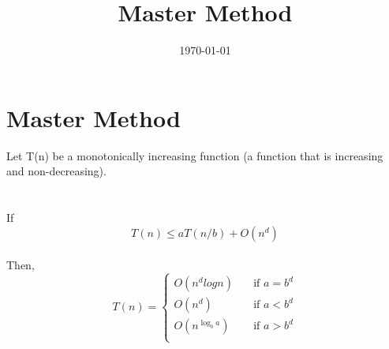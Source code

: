 \documentclass[a4paper, 12pt]{article}
\begin{document}
\title{Master Method}
\date{\today}
\pagestyle{empty} 
\section*{Master Method}
	Let T(n) be a monotonically increasing function (a function that is increasing and non-decreasing).\\
	\\
	\\
	If $$T(n) \leq aT(n/b) + O(n^d)$$
	\\
	Then,
	\[ T(n) = 
		\begin{cases}
		O(n^d log n) & \quad \text{if } a = b^d\\
		O(n^d) & \quad \text{if } a < b^d\\
		O(n^{\log_{b}a}) & \quad \text{if } a > b^d\\
		\end{cases}
	\]
\end{document}
